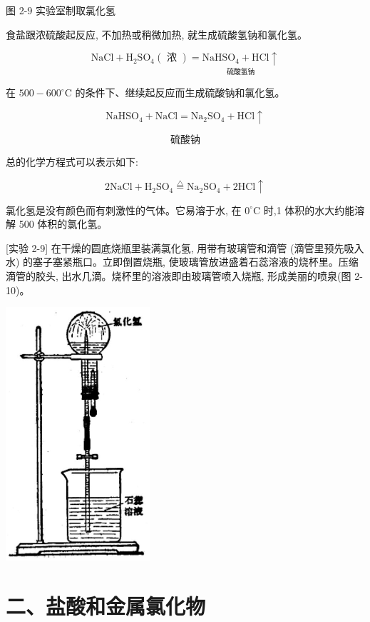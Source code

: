 \documentclass[10pt]{article}
\begin{document}
图 2-9 实验室制取氯化氢

食盐跟浓硫酸起反应, 不加热或稍微加热, 就生成硫酸氢钠和氯化氢。

\[
\mathrm{{NaCl}} + {\mathrm{H}}_{2}{\mathrm{{SO}}}_{4}\left( \text{ 浓 }\right) = \underset{\text{ 硫酸氢钠 }}{{\mathrm{{NaHSO}}}_{4} + \mathrm{{HCl}} \uparrow }
\]

在 \({500} - {600}^{ \circ }\mathrm{C}\) 的条件下、继续起反应而生成硫酸钠和氯化氢。

\[
{\mathrm{{NaHSO}}}_{4} + \mathrm{{NaCl}} = {\mathrm{{Na}}}_{2}{\mathrm{{SO}}}_{4} + \mathrm{{HCl}} \uparrow
\]

\[
\text{硫酸钠}
\]

总的化学方程式可以表示如下:

\[
2\mathrm{{NaCl}} + {\mathrm{H}}_{2}{\mathrm{{SO}}}_{4}\overset{\bigtriangleup }{ = }{\mathrm{{Na}}}_{2}{\mathrm{{SO}}}_{4} + 2\mathrm{{HCl}} \uparrow
\]

氯化氢是没有颜色而有刺激性的气体。它易溶于水, 在 \({0}^{ \circ }\mathrm{C}\) 时,1 体积的水大约能溶解 500 体积的氯化氢。

[实验 2-9] 在干燥的圆底烧瓶里装满氯化氢, 用带有玻璃管和滴管 (滴管里预先吸入水) 的塞子塞紧瓶口。立即倒置烧瓶, 使玻璃管放进盛着石蕊溶液的烧杯里。压缩滴管的胶头, 出水几滴。烧杯里的溶液即由玻璃管喷入烧瓶, 形成美丽的喷泉(图 2-10)。

\begin{center}
\includegraphics[max width=0.4\textwidth]{images/01912d0f-097c-7e75-8f32-4f326cd86c9f_40_464001.jpg}
\end{center}

\section*{二、盐酸和金属氯化物}
\end{document}
